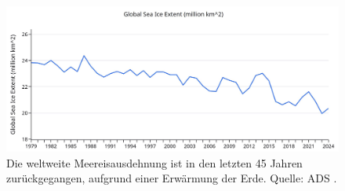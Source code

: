 \documentclass[10pt,twocolumn,letterpaper]{article}
\begin{document}
\begin{figure}[t]
\begin{center}
\includegraphics[width=1\textwidth]{ice.jpg}
\end{center}
   \caption{Die weltweite Meereisausdehnung ist in den letzten 45 Jahren zurückgegangen, aufgrund einer Erwärmung der Erde. Quelle: ADS \cite{149}.}
\label{fig:24}
\end{figure}

\clearpage
\twocolumn

{\small


}
\end{document}
